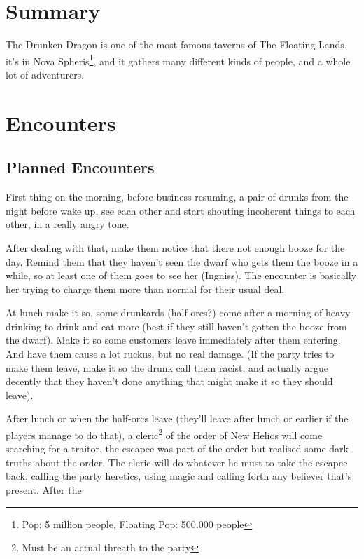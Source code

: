 


\section{Summary}
The Drunken Dragon is one of the most famous taverns of The Floating Lands, it's in Nova Spheris\footnote{Pop: 5 million people, Floating Pop: 500.000 people}, and it gathers many different kinds of people, and a whole lot of adventurers.

\section{Encounters}
\subsection{Planned Encounters}
First thing on the morning, before business resuming, a pair of drunks from the night before wake up, see each other and start shouting incoherent things to each other, in a really angry tone.

After dealing with that, make them notice that there not enough booze for the day. Remind them that they haven't seen the dwarf who gets them the booze in a while, so at least one of them goes to see her (Ingniss). The encounter is basically her trying to charge them more than normal for their usual deal.

At lunch make it so, some drunkards (half-orcs?) come after a morning of heavy drinking to drink and eat more (best if they still haven't gotten the booze from the dwarf). Make it so some customers leave immediately after them entering. And have them cause a lot ruckus, but no real damage. (If the party tries to make them leave, make it so the drunk call them racist, and actually argue decently that they haven't done anything that might make it so they should leave).

After lunch or when the half-orcs leave (they'll leave after lunch or earlier if the players manage to do that), a cleric\footnote{Must be an actual threath to the party} of the order of New Helios will come searching for a traitor, the escapee was part of the order but realised some dark truths about the order. The cleric will do whatever he must to take the escapee back, calling the party heretics, using magic and calling forth any believer that's present. After the


